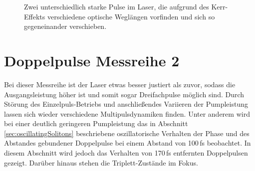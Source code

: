 \documentclass[bachelor,       %
               twoside,        %
               BCOR10mm,       %
               liststotoc,nomtotoc,bibtotoc, %
               english,ngerman, %
               final,          %
               ]{GAUBM}
\begin{document}
\begin{figure}[!htb]
   \centering   
   \hfill
   \caption{Zwei unterschiedlich starke Pulse im Laser, die aufgrund des Kerr-Effekts verschiedene optische Weglängen vorfinden und sich so gegeneinander verschieben.}
   \label{fig:running441}
 \end{figure}


\section{Doppelpulse Messreihe 2}
Bei dieser Messreihe ist der Laser etwas besser justiert als zuvor, sodass die Ausgangsleistung höher ist und somit sogar Dreifachpulse möglich sind.
Durch Störung des Einzelpuls-Betriebs und anschließendes Variieren der Pumpleistung lassen sich wieder verschiedene Multipulsdynamiken finden.
Unter anderem wird bei einer deutlich geringeren Pumpleistung das in Abschnitt \ref{sec:oscillatingSolitons} beschriebene oszillatorische Verhalten der Phase und des Abstandes gebundener Doppelpulse bei einem Abstand von 100\,fs beobachtet.
In diesem Abschnitt wird jedoch das Verhalten von 170\,fs entfernten Doppelpulsen gezeigt.
Darüber hinaus stehen die Triplett-Zustände im Fokus.
\end{document}
